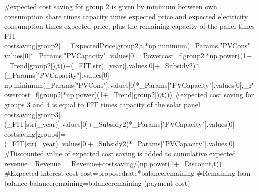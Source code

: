 \documentclass[
  letterpaper,
  DIV=11,
  numbers=noendperiod]{scrartcl}
\newenvironment{Shaded}{\begin{snugshade}}{\end{snugshade}}
\newcommand{\BuiltInTok}[1]{\textcolor[rgb]{0.00,0.23,0.31}{#1}}
\newcommand{\CommentTok}[1]{\textcolor[rgb]{0.37,0.37,0.37}{#1}}
\newcommand{\DecValTok}[1]{\textcolor[rgb]{0.68,0.00,0.00}{#1}}
\newcommand{\NormalTok}[1]{\textcolor[rgb]{0.00,0.23,0.31}{#1}}
\newcommand{\OperatorTok}[1]{\textcolor[rgb]{0.37,0.37,0.37}{#1}}
\newcommand{\StringTok}[1]{\textcolor[rgb]{0.13,0.47,0.30}{#1}}
\begin{document}
\begin{Shaded}
\begin{Highlighting}[]
        \CommentTok{\#expected cost saving for group 2 is given by minimum between own consumption share times capacity times expected price and expected electricity consumption times expected price, plus the remaining capacity of the panel times FIT}
\NormalTok{        costsaving[group2]}\OperatorTok{=}\NormalTok{\_ExpectedPrice[group2,t]}\OperatorTok{*}\NormalTok{np.minimum(\_Params[}\StringTok{"PVCons"}\NormalTok{].values[}\DecValTok{0}\NormalTok{]}\OperatorTok{*}\NormalTok{\_Params[}\StringTok{"PVCapacity"}\NormalTok{].values[}\DecValTok{0}\NormalTok{],\_Powercost\_f[group2]}\OperatorTok{*}\NormalTok{np.power((}\DecValTok{1}\OperatorTok{+}\NormalTok{\_Trend[group2]),t))}\OperatorTok{+}\NormalTok{(\_FIT[}\BuiltInTok{str}\NormalTok{(\_year)].values[}\DecValTok{0}\NormalTok{]}\OperatorTok{+}\NormalTok{\_Subsidy2)}\OperatorTok{*}\NormalTok{(\_Params[}\StringTok{"PVCapacity"}\NormalTok{].values[}\DecValTok{0}\NormalTok{]}\OperatorTok{{-}}\NormalTok{np.minimum(\_Params[}\StringTok{"PVCons"}\NormalTok{].values[}\DecValTok{0}\NormalTok{]}\OperatorTok{*}\NormalTok{\_Params[}\StringTok{"PVCapacity"}\NormalTok{].values[}\DecValTok{0}\NormalTok{],\_Powercost\_f[group2]}\OperatorTok{*}\NormalTok{np.power((}\DecValTok{1}\OperatorTok{+}\NormalTok{\_Trend[group2]),t)))}
        \CommentTok{\#expected cost saving for groups 3 and 4 is equal to FIT times capacity of the solar panel}
\NormalTok{        costsaving[group3]}\OperatorTok{=}\NormalTok{(\_FIT[}\BuiltInTok{str}\NormalTok{(\_year)].values[}\DecValTok{0}\NormalTok{]}\OperatorTok{+}\NormalTok{\_Subsidy2)}\OperatorTok{*}\NormalTok{\_Params[}\StringTok{"PVCapacity"}\NormalTok{].values[}\DecValTok{0}\NormalTok{]}
\NormalTok{        costsaving[group4]}\OperatorTok{=}\NormalTok{(\_FIT[}\BuiltInTok{str}\NormalTok{(\_year)].values[}\DecValTok{0}\NormalTok{]}\OperatorTok{+}\NormalTok{\_Subsidy2)}\OperatorTok{*}\NormalTok{\_Params[}\StringTok{"PVCapacity"}\NormalTok{].values[}\DecValTok{0}\NormalTok{]}
        \CommentTok{\#Discounted value of expected cost saving is added to cumulative expected revenue}
\NormalTok{        \_Revenue}\OperatorTok{=}\NormalTok{\_Revenue}\OperatorTok{+}\NormalTok{costsaving}\OperatorTok{/}\NormalTok{(np.power(}\DecValTok{1}\OperatorTok{+}\NormalTok{\_Discount,t))}
        \CommentTok{\#Expected interest cost}
\NormalTok{        cost}\OperatorTok{=}\NormalTok{proposedrate}\OperatorTok{*}\NormalTok{balanceremaining}
        \CommentTok{\#Remaining loan balance}
\NormalTok{        balanceremaining}\OperatorTok{=}\NormalTok{balanceremaining}\OperatorTok{{-}}\NormalTok{(payment}\OperatorTok{{-}}\NormalTok{cost)}

\end{Highlighting}
\end{Shaded}
\end{document}
